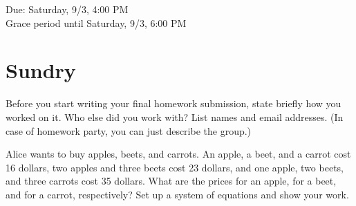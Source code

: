 \documentclass[11pt]{article}
\begin{document}
\maketitle
\fontsize{12}{15}\selectfont

\begin{center}
    Due: Saturday, 9/3, 4:00 PM \\
    Grace period until Saturday, 9/3, 6:00 PM \\
\end{center}

\section*{Sundry}
Before you start writing your final homework submission, state briefly how you worked on it.  Who else did you work with?  List names and email addresses.  (In case of homework party, you can just describe the group.)

{\color{blue}{I did not work with anybody to complete this homework. I did go to office hours once to ask for conceptual understanding of set operations, but I did not get any other help outside of that.}}

\vspace{15pt}


Alice wants to buy apples, beets, and carrots. An apple, a beet, and a carrot cost 16 dollars, two apples and three beets cost 23 dollars, and one apple, two beets, and three carrots cost 35 dollars. What are the prices for an apple, for a beet, and for a carrot, respectively? Set up a system of equations and show your work.
\end{document}
